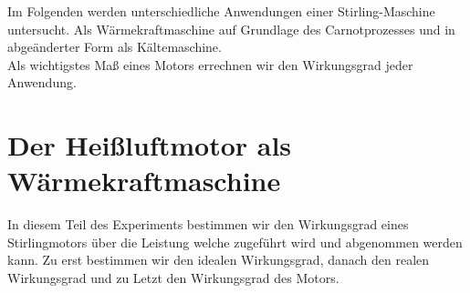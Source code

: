 \documentclass[12pt,a4paper]{article}
\begin{document}
\begin{multicols}{2}




%			


\noindent Im Folgenden werden unterschiedliche Anwendungen einer Stirling-Maschine untersucht. Als Wärmekraftmaschine auf Grundlage des Carnotprozesses und in abgeänderter Form als Kältemaschine.\\
Als wichtigstes Maß eines Motors errechnen wir den Wirkungsgrad jeder Anwendung.


\section{Der Heißluftmotor als Wärmekraftmaschine}
In diesem Teil des Experiments bestimmen wir den Wirkungsgrad eines Stirlingmotors über die Leistung welche zugeführt wird und abgenommen werden kann. Zu erst bestimmen wir den idealen Wirkungsgrad, danach den realen Wirkungsgrad und zu Letzt den Wirkungsgrad des Motors.


\end{multicols}
\end{document}
